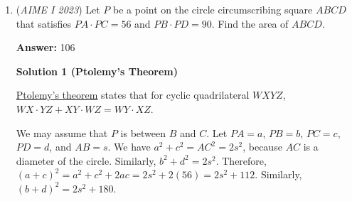 \begin{enumerate}
\textbf{Solution 3 (Educated Guess and Engineer's Induction (Fake solve))}

Try smaller cases. There is clearly only one $m$ that makes $\frac{2!}{m}$ a square, and this is $m=2$. Here, the sum of the exponents in the prime factorization is just $1$. Furthermore, the only $m$ that makes $\frac{3!}{m}$ a square is $m = 6 = 2^13^1$, and the sum of the exponents is $2$ here. Trying $\frac{4!}{m}$ and $\frac{5!}{m}$, the sums of the exponents are $3$ and $4$. Based on this, we (incorrectly!) conclude that, when we are given $\frac{n!}{m}$, the desired sum is $n-1$. The problem gives us $\frac{13!}{m}$, so the answer is $13-1 = \boxed{012}$.

 -InsetIowa9

 However...

 The induction fails starting at $n = 9$ !The actual answers $f(n)$ for small $n$ are:$0, 1, 2, 3, 4, 5, 6, 7, 7, 7, 8, 11, 12$In general, $f(p) = f(p-1)+1$ if p is prime, $n=4,6,8$ are "lucky", and the pattern breaks down after $n=8$

 -"fake"  warning by oinava

 


 


	\item (\textit{AIME I 2023}) Let $P$ be a point on the circle circumscribing square $ABCD$ that satisfies $PA \cdot PC = 56$ and $PB \cdot PD = 90.$ Find the area of $ABCD.$

 \textbf{Answer: }106



\textbf{Solution 1 (Ptolemy's Theorem)}

\href{https://artofproblemsolving.com/wiki/index.php?title=Ptolemy\%27s\_theorem}{Ptolemy's theorem} states that for cyclic quadrilateral $WXYZ$, $WX\cdot YZ + XY\cdot WZ = WY\cdot XZ$.

 We may assume that $P$ is between $B$ and $C$. Let $PA = a$, $PB = b$, $PC = c$, $PD = d$, and $AB = s$. We have $a^2 + c^2 = AC^2 = 2s^2$, because $AC$ is a diameter of the circle. Similarly, $b^2 + d^2 = 2s^2$. Therefore, $(a+c)^2 = a^2 + c^2 + 2ac = 2s^2 + 2(56) = 2s^2 + 112$. Similarly, $(b+d)^2 = 2s^2 + 180$. 


\end{enumerate}
